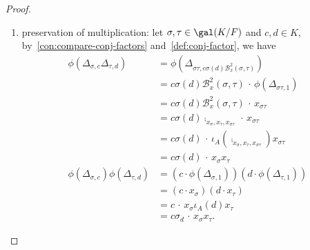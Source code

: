 \begin{proof}
\begin{enumerate}
\[\begin{aligned}
            \phi(1)
            &= \phi\left(\Delta_{\id,\mathcal{B}^{2}_{x}(\id,\id)^{-1}}\right) \\
            &= \mathcal{B}^{2}_{x}(\id,\id)^{-1} \phi\left(\Delta_{\id, 1}\right) \\
            &= \mathcal{B}^{2}_{x}(\id,\id)^{-1} x_{\id} \\
            &= \comp_{x_{\id},x_{\id},x_{\id}}^{-1} x_{\id} \\
            &= \comp_{x_{\id},x_{\id},x_{\id}} x_{\id} x_{\id} x_{\id}^{-1} \\
            &= x_{\id} x_{\id}^{-1} \\
            &= 1.
          \end{aligned}
          \]
    \item preservation of multiplication: let $\sigma,\tau\in\gal(K/F)$ and $c,d \in K$, by~\cref{con:compare-conj-factors} and~\cref{def:conj-factor}, we have
          \[
          \begin{aligned}
            \phi\left(\Delta_{\sigma,c}\Delta_{\tau,d}\right)
            &= \phi\left(\Delta_{\sigma\tau, c\sigma(d)\mathcal{B}^{2}_{x}(\sigma,\tau)}\right) \\
            &= c\sigma(d)\mathcal{B}^{2}_{x}(\sigma,\tau) \,\cdot\, \phi\left(\Delta_{\sigma\tau, 1}\right) \\
            &= c\sigma(d)\mathcal{B}^{2}_{x}(\sigma,\tau) \,\cdot\, x_{\sigma\tau} \\
            &= c\sigma(d)\comp_{x_{\sigma},x_{\tau},x_{\sigma\tau}} \,\cdot\, x_{\sigma\tau} \\
            &= c\sigma(d)\,\cdot\, \iota_{A}\left(\comp_{x_{\sigma},x_{\tau},x_{\sigma\tau}}\right)x_{\sigma\tau} \\
            &= c\sigma(d) \,\cdot\, x_{\sigma}x_{\tau}\\
            \phi\left(\Delta_{\sigma,c}\right)\phi\left(\Delta_{\tau,d}\right)
            &=\left(c \cdot \phi\left(\Delta_{\sigma, 1}\right)\right)
              \left(d \cdot \phi\left(\Delta_{\tau, 1}\right)\right) \\
            &= \left(c \cdot x_{\sigma}\right) \left(d \cdot x_{\tau}\right)\\
            &= c \,\cdot\, x_{\sigma}\iota_{A}(d) x_{\tau} \\
            &= c\sigma_{d} \,\cdot\, x_{\sigma}x_{\tau}.
          \end{aligned}
          \]
  \end{enumerate}
\end{proof}

